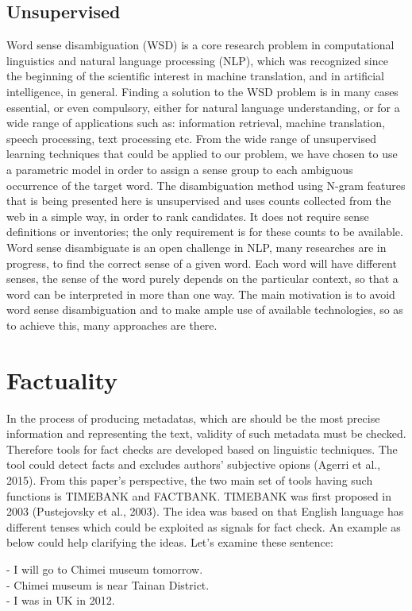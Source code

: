 \subsection*{Unsupervised}
Word sense disambiguation (WSD) is a core research problem in computational linguistics and natural language processing (NLP), which was recognized since the beginning of the scientific interest in machine translation, and in artificial intelligence, in general. Finding a solution to the WSD problem is in many cases essential, or even compulsory, either for natural language understanding, or for a wide range of applications such as: information retrieval, machine translation, speech processing, text processing etc. From the wide range of unsupervised learning techniques that could be applied to our problem, we have chosen to use a parametric model in order to assign a sense group to each ambiguous occurrence of the target word. The disambiguation method using N-gram features that is being presented here is unsupervised and uses counts collected from the web in a simple way, in order to rank candidates. It does not require sense definitions or inventories; the only requirement is for these counts to be available. \\

Word sense disambiguate is an open challenge in NLP, many researches are in progress, to find the correct sense of a given word. Each word will have different senses, the sense of the word purely depends on the particular context, so that a word can be interpreted in more than one way. The main motivation is to avoid word sense disambiguation and to make ample use of available technologies, so as to achieve this, many approaches are there.\\
\section*{Factuality}
In the process of producing metadatas, which are should be the most precise information and representing the text, validity of such metadata must be checked. Therefore tools for fact checks are developed based on linguistic techniques.  The tool could detect facts and excludes authors' subjective opions (Agerri et al., 2015). From this paper's perspective, the two main set of tools having such functions is TIMEBANK and FACTBANK.
TIMEBANK was first proposed in 2003 (Pustejovsky et al., 2003). The idea was based on that English language has different tenses which could be exploited as signals for fact check. An example as below could help clarifying the ideas. Let's examine these sentence:\\
\begin{flushleft}
	-	I will go to Chimei museum tomorrow.\\
	-	Chimei museum is near Tainan District.\\
	-	I was in UK in 2012.\\
\end{flushleft}

